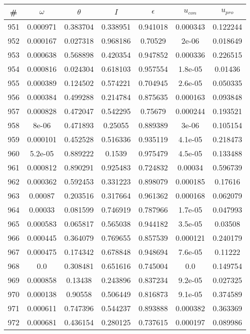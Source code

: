 \newpage
\begin{table}
\begin{tabular}{c|c|c|c|c|c|c}
\# & $\omega$ & $\theta$ & $I$ & $\epsilon$ & $u_{con}$ & $u_{pro}$\\
\hline
951 & 0.000971 & 0.383704 & 0.338951 & 0.941018 & 0.000343 & 0.122244\\
952 & 0.000167 & 0.027318 & 0.968186 & 0.70529 & 2e-06 & 0.018649\\
953 & 0.000638 & 0.568898 & 0.420354 & 0.947852 & 0.000336 & 0.226515\\
954 & 0.000816 & 0.024304 & 0.618103 & 0.957554 & 1.8e-05 & 0.01436\\
955 & 0.000389 & 0.124502 & 0.574221 & 0.704945 & 2.6e-05 & 0.050335\\
956 & 0.000384 & 0.499288 & 0.214784 & 0.875635 & 0.000163 & 0.093848\\
957 & 0.000828 & 0.472047 & 0.542295 & 0.75679 & 0.000244 & 0.193521\\
958 & 8e-06 & 0.471893 & 0.25055 & 0.889389 & 3e-06 & 0.105154\\
959 & 0.000101 & 0.452528 & 0.516336 & 0.935119 & 4.1e-05 & 0.218473\\
960 & 5.2e-05 & 0.889222 & 0.1539 & 0.975479 & 4.5e-05 & 0.133488\\
961 & 0.000812 & 0.890291 & 0.925483 & 0.724832 & 0.00034 & 0.596739\\
962 & 0.000362 & 0.592453 & 0.331223 & 0.898079 & 0.000185 & 0.17616\\
963 & 0.00087 & 0.203516 & 0.317664 & 0.961362 & 0.000168 & 0.062079\\
964 & 0.00033 & 0.081599 & 0.746919 & 0.787966 & 1.7e-05 & 0.047993\\
965 & 0.000583 & 0.065817 & 0.565038 & 0.944182 & 3.5e-05 & 0.03508\\
966 & 0.000445 & 0.364079 & 0.769655 & 0.857539 & 0.000121 & 0.240179\\
967 & 0.000475 & 0.174342 & 0.678848 & 0.948694 & 7.6e-05 & 0.11222\\
968 & 0.0 & 0.308481 & 0.651616 & 0.745004 & 0.0 & 0.149754\\
969 & 0.000858 & 0.13438 & 0.243896 & 0.837234 & 9.2e-05 & 0.027325\\
970 & 0.000138 & 0.90558 & 0.506449 & 0.816873 & 9.1e-05 & 0.374589\\
971 & 0.000611 & 0.747396 & 0.544237 & 0.893888 & 0.000382 & 0.363369\\
972 & 0.000681 & 0.436154 & 0.280125 & 0.737615 & 0.000197 & 0.089986\\

\end{tabular}
\end{table}

